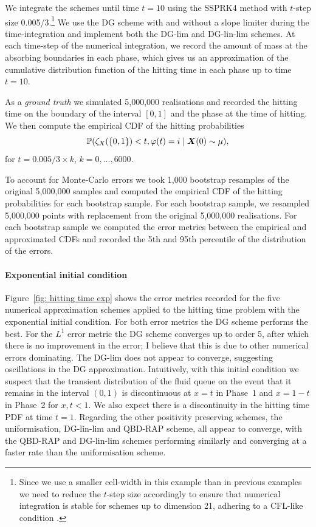 We integrate the schemes until time \(t=10\) using the SSPRK4 method with \(t\)-step size 0.005/3.\footnote{Since we use a smaller cell-width in this example than in previous examples we need to reduce the \(t\)-step size accordingly to ensure that numerical integration is stable for schemes up to dimension 21, adhering to a CFL-like condition \cite[Section~4.8]{nodalDGBook}.} We use the DG scheme with and without a slope limiter during the time-integration and implement both the DG-lim and DG-lin-lim schemes. At each time-step of the numerical integration, we record the amount of mass at the absorbing boundaries in each phase, which gives us an approximation of the cumulative distribution function of the hitting time in each phase up to time \(t=10\). 

As a \emph{ground truth} we simulated 5,000,000 realisations and recorded the hitting time on the boundary of the interval \([0,1]\) and the phase at the time of hitting. We then compute the empirical CDF of the hitting probabilities 
\[\mathbb P(\zeta_{X}(\{0,1\}) < t, \varphi(t)=i\mid \boldsymbol X(0)\sim \mu),\] 
for \(t=0.005/3\times k\), \(k=0,...,6000\). 

To account for Monte-Carlo errors we took 1,000 bootstrap resamples of the original 5,000,000 samples and computed the empirical CDF of the hitting probabilities for each bootstrap sample. For each bootstrap sample, we resampled 5,000,000 points with replacement from the original 5,000,000 realisations. For each bootstrap sample we computed the error metrics between the empirical and approximated CDFs and recorded the 5th and 95th percentile of the distribution of the errors. 

\paragraph{Exponential initial condition}
Figure~\ref{fig: hitting time exp} shows the error metrics recorded for the five numerical approximation schemes applied to the hitting time problem with the exponential initial condition. For both error metrics the DG scheme performs the best. For the \(L^1\) error metric the DG scheme converges up to order 5, after which there is no improvement in the error; I believe that this is due to other numerical errors dominating. The DG-lim does not appear to converge, suggesting oscillations in the DG approximation. Intuitively, with this initial condition we suspect that the transient distribution of the fluid queue on the event that it remains in the interval \((0,1)\) is discontinuous at \(x=t\) in Phase~1 and \(x=1-t\) in Phase~2 for \(x,t<1\). We also expect there is a discontinuity in the hitting time PDF at time \(t=1\). Regarding the other positivity preserving schemes, the uniformisation, DG-lin-lim and QBD-RAP scheme, all appear to converge, with the QBD-RAP and DG-lin-lim schemes performing similarly and converging at a faster rate than the uniformisation scheme. 

